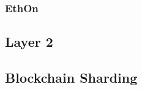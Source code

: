 \subsubsection{EthOn}
\label{subsubsec:ethon}


\subsection{Layer 2}

\subsection{Blockchain Sharding}







